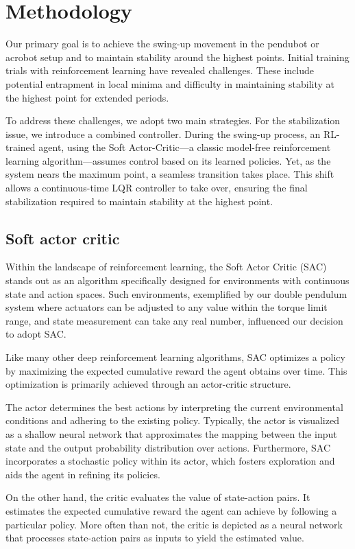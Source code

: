 \chapter{Methodology}
Our primary goal is to achieve the swing-up movement in the pendubot or acrobot setup and to maintain stability around the highest points. Initial training trials with reinforcement learning have revealed challenges. These include potential entrapment in local minima and difficulty in maintaining stability at the highest point for extended periods. 

To address these challenges, we adopt two main strategies. For the stabilization issue, we introduce a combined controller. During the swing-up process, an RL-trained agent, using the Soft Actor-Critic—a classic model-free reinforcement learning algorithm—assumes control based on its learned policies. Yet, as the system nears the maximum point, a seamless transition takes place. This shift allows a continuous-time LQR controller to take over, ensuring the final stabilization required to maintain stability at the highest point.

\section{Soft actor critic}
Within the landscape of reinforcement learning, the Soft Actor Critic (SAC)\cite{haarnoja2018soft} stands out as an algorithm specifically designed for environments with continuous state and action spaces. Such environments, exemplified by our double pendulum system where actuators can be adjusted to any value within the torque limit range, and state measurement can take any real number, influenced our decision to adopt SAC.

Like many other deep reinforcement learning algorithms, SAC optimizes a policy by maximizing the expected cumulative reward the agent obtains over time. This optimization is primarily achieved through an actor-critic structure\cite{konda1999actor}.

The actor determines the best actions by interpreting the current environmental conditions and adhering to the existing policy. Typically, the actor is visualized as a shallow neural network that approximates the mapping between the input state and the output probability distribution over actions. Furthermore, SAC incorporates a stochastic policy within its actor, which fosters exploration and aids the agent in refining its policies.

On the other hand, the critic evaluates the value of state-action pairs. It estimates the expected cumulative reward the agent can achieve by following a particular policy. More often than not, the critic is depicted as a neural network that processes state-action pairs as inputs to yield the estimated value.

